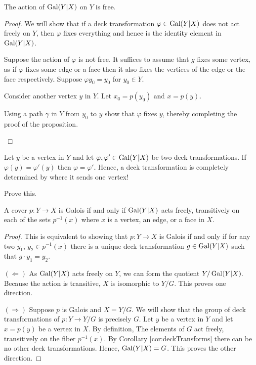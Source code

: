 \begin{theorem}
  \label{theorem:freenessGaloisAction}
  The action of $\operatorname{Gal}(Y|X)$ on $Y$ is free.
\end{theorem}
\begin{proof}
  We will show that if a deck transformation $\varphi \in \operatorname{Gal}(Y|X)$ does not act freely on $ Y$, then $\varphi$ fixes everything and hence is the identity element in $\operatorname{Gal}(Y|X)$.

  Suppose the action of $\varphi$ is not free. It suffices to assume that $g$ fixes some vertex, as if $\varphi$ fixes some edge or a face then it also fixes the vertices of the edge or the face respectively. Suppose $\varphi y_0 = y_0$ for $y_0 \in Y$.

  Consider another vertex $y$ in $Y$. Let $x_0 = p(y_0)$ and $x = p(y)$.
  \begin{qbox}
    Using a path $\gamma$ in $Y$ from $y_0$ to $y$ show that $\varphi$ fixes $y$, thereby completing the proof of the proposition.
  \end{qbox}
\end{proof}


\begin{corollary}
  \label{cor:deckTransforms}
  Let $y$ be a vertex in $Y$ and let $\varphi, \varphi' \in \operatorname{Gal}(Y|X)$ be two deck transformations. If $\varphi(y) = \varphi'(y)$ then $\varphi = \varphi'$. Hence, a deck transformation is completely determined by where it sends one vertex!
\end{corollary}
\begin{qbox}
  Prove this.
\end{qbox}

\begin{theorem}
  \label{theorem:GaloisCriterion}
  A cover $p:Y \rightarrow X$ is Galois if and only if $\operatorname{Gal}(Y|X)$ acts freely, transitively on each of the sets $p^{-1}(x)$ where $x$ is a vertex, an edge, or a face in $X$.
\end{theorem}
\begin{proof}
  This is equivalent to showing that $p:Y \rightarrow X$ is Galois if and only if for any two $y_1$, $y_2 \in p^{-1}(x)$ there is a unique deck transformation $g \in \operatorname{Gal}(Y|X)$ such that $g \cdot y_1 = y_2$.

  $(\Leftarrow)$ As $\operatorname{Gal}(Y|X)$ acts freely on $Y$, we can form the quotient $Y / \operatorname{Gal}(Y|X)$. Because the action is transitive, $X$ is isomorphic to $Y/G$.
  This proves one direction.

  $(\Rightarrow)$ Suppose $p$ is Galois and $X = Y/G$. We will show that the group of deck transformations of $p: Y \rightarrow Y/G$ is precisely $G$.
  Let $y$ be a vertex in $Y$ and let $x = p(y)$ be a vertex in $X$.
  By definition, The elements of $G$ act freely, transitively on the fiber $p^{-1}(x)$.
  By Corollary \ref{cor:deckTransforms} there can be no other deck transformations.
  Hence, $\operatorname{Gal}(Y|X) = G$.
  This proves the other direction.
\end{proof}

